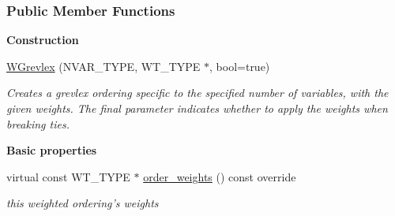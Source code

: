 \subsubsection*{Public Member Functions}
\begin{Indent}\textbf{ Construction}\par
\begin{DoxyCompactItemize}
\item 
\mbox{\label{group__orderinggroup_a0ac3e66fb20c098427f6a08c92fd3771}} 
\hyperlink{group__orderinggroup_a0ac3e66fb20c098427f6a08c92fd3771}{W\+Grevlex} (N\+V\+A\+R\+\_\+\+T\+Y\+PE, W\+T\+\_\+\+T\+Y\+PE $\ast$, bool=true)
\begin{DoxyCompactList}\small\item\em Creates a grevlex ordering specific to the specified number of variables, with the given weights. The final parameter indicates whether to apply the weights when breaking ties. \end{DoxyCompactList}\end{DoxyCompactItemize}
\end{Indent}
\begin{Indent}\textbf{ Basic properties}\par
\begin{DoxyCompactItemize}
\item 
\mbox{\label{group__orderinggroup_a2eb6db0248ec4b205d15b5b1b2261db6}} 
virtual const W\+T\+\_\+\+T\+Y\+PE $\ast$ \hyperlink{group__orderinggroup_a2eb6db0248ec4b205d15b5b1b2261db6}{order\+\_\+weights} () const override
\begin{DoxyCompactList}\small\item\em this weighted ordering's weights \end{DoxyCompactList}\end{DoxyCompactItemize}
\end{Indent}
